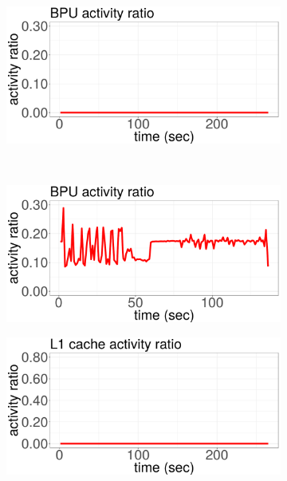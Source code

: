 \begin{figure}[p]
\begin{subfigure}[b]{.48\textwidth}
  \end{subfigure}%
	\vspace{0.1cm}
	\begin{subfigure}[b]{.48\textwidth}
  	\includegraphics[width=\textwidth]{power_aware_job_scheduling/figures/activity_ratios/blackscholes_BPU}
  \end{subfigure}%
~
	\begin{subfigure}[b]{.48\textwidth}
  	\includegraphics[width=\textwidth]{power_aware_job_scheduling/figures/activity_ratios/bodytrack_BPU}
  \end{subfigure}%
	\vspace{0.1cm}
	\begin{subfigure}[b]{.48\textwidth}
  	\includegraphics[width=\textwidth]{power_aware_job_scheduling/figures/activity_ratios/blackscholes_L1}

\end{subfigure}
\end{figure}
